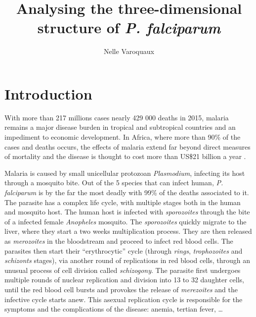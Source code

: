 \documentclass[letterpaper,12pt]{article}
\begin{document}
\title{Analysing the three-dimensional structure of {\em P. falciparum}}
\author{Nelle Varoquaux}



\begin{abstract}

\end{abstract}


\section{Introduction}
\label{sec:introduction}

With more than 217 millions cases nearly 429 000 deaths in 2015,  malaria
remains a major disease burden in tropical and subtropical countries and an
impediment to economic development. In Africa, where more than 90\% of the
cases and deaths occurs, the effects of malaria extend far beyond direct
measures of mortality and the disease is thought to cost more than US\$21
billion a year \citep{onwejkwe:do}.

Malaria is caused by small unicellular protozoan {\em Plasmodium}, infecting
its host through a mosquito bite. Out of the 5 species that can infect human,
{\em P. falciparum} is by the far the most deadly with 99\% of the deaths
associated to it. The parasite has a complex life cycle, with multiple stages
both in the human and mosquito host. The human host is infected with
\textit{sporozoites} through the bite of a infected female  {\em Anopheles}
mosquito. The \textit{sporozoites} quickly migrate to the liver, where they
start a two weeks multiplication process. They are then released as
\textit{merozoites} in the bloodstream and proceed to infect red blood cells. The
parasites then start their ``erythrocytic'' cycle (through \textit{rings},
\textit{trophozoites} and \textit{schizonts} stages), via another round of
replications in red blood cells, through an unusual process of cell division
called \textit{schizogony}. The parasite first undergoes multiple rounds of nuclear
replication and division into 13 to 32 daughter cells, until the red blood
cell bursts and provokes the release of \textit{merezoites} and the infective cycle
starts anew. This asexual replication cycle is responsible for the symptoms
and the complications of the disease: anemia, tertian fever, \dots
\end{document}
